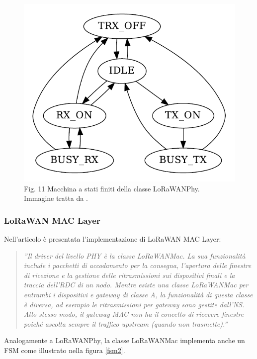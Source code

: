 \documentclass[a4paper]{report} %
\begin{document}
\begin{figure}
\centering
\includegraphics[scale=.5]{Immagini/MSFLoRaWAN.png}
\label{fsm1}
Fig. 11 Macchina a stati finiti della classe LoRaWANPhy.\\
Immagine tratta da \cite{art:rif.49}. \\
\end{figure}

\subsubsection{LoRaWAN MAC Layer} 
Nell'articolo \cite{art:rif.49} è presentata l'implementazione di LoRaWAN MAC Layer:
\begin{quote}
	\textit{''Il driver del livello PHY è la classe LoRaWANMac. La sua funzionalità include i pacchetti di accodamento per la consegna, l'apertura delle finestre di ricezione e la gestione delle ritrasmissioni sui dispositivi finali e la traccia dell'RDC di un nodo. Mentre esiste una classe LoRaWANMac per entrambi i dispositivi e gateway di classe A, la funzionalità di questa classe è diversa, ad esempio le ritrasmissioni per gateway sono gestite dall'NS. Allo stesso modo, il gateway MAC non ha il concetto di ricevere finestre poiché ascolta sempre il traffico upstream (quando non trasmette).''}
\end{quote}
Analogamente a LoRaWANPhy, la classe LoRaWANMac implementa anche un FSM come illustrato nella figura \ref{fsm2}. 
\end{document}
